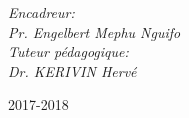 \begin{titlepage}
\begin{center}
\begin{minipage}{0.4\textwidth}
\begin{flushleft}
\end{flushleft}
\end{minipage}
\begin{minipage}{0.4\textwidth}
\begin{flushright} \large
\emph{Encadreur:} \\ \textit{Pr. Engelbert Mephu Nguifo}\\
\emph{Tuteur pédagogique:} \\
\textit{Dr. KERIVIN Hervé}
\end{flushright}
\end{minipage}

\vfill

{\Large 2017-2018}
\end{center}
\end{titlepage}